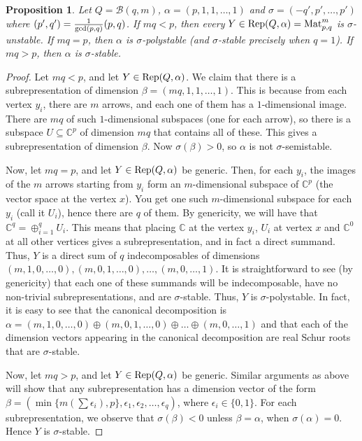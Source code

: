 \documentclass[11pt]{amsart}
\newtheorem{proposition}[theorem]{Proposition}
\theoremstyle{definition}
\newcommand{\Rep}{{\rm Rep}}
\newcommand{\C}{{\mathbb C}}
\newcommand{\Mat}{\operatorname{Mat}}
\begin{document}
\begin{proposition} \label{stab.star}
Let $Q = \mathcal{B}(q,m)$, $\alpha = (p,1,1,\dots,1)$ and $\sigma = (-q',p',\dots,p')$ where $(p',q') = \frac{1}{{\rm gcd}(p,q)} (p,q)$. If $mq < p$, then every $Y \in \Rep(Q,\alpha) = \Mat_{p,q}^m$ is $\sigma$-unstable. If $mq = p$, then $\alpha$ is $\sigma$-polystable (and $\sigma$-stable precisely when $q = 1$). If $mq > p$, then $\alpha$ is $\sigma$-stable.
\end{proposition}


\begin{proof}
Let $mq < p$, and let $Y \in \Rep(Q,\alpha)$. We claim that there is a subrepresentation of dimension $\beta = (mq,1,1,\dots,1)$. This is because from each vertex $y_i$, there are $m$ arrows, and each one of them has a $1$-dimensional image. There are $mq$ of such $1$-dimensional subspaces (one for each arrow), so there is a subspace $U \subseteq \C^p$ of dimension $mq$ that contains all of these. This gives a subrepresentation of dimension $\beta$. Now $\sigma(\beta) > 0$, so $\alpha$ is not $\sigma$-semistable.


Now, let $mq = p$, and let $Y \in \Rep(Q,\alpha)$ be generic. Then, for each $y_i$, the images of the $m$ arrows starting from $y_i$ form an $m$-dimensional subspace of $\C^p$ (the vector space at the vertex $x$). You get one such $m$-dimensional subspace for each $y_i$ (call it $U_i$), hence there are $q$ of them. By genericity, we will have that $\C^q = \oplus_{i=1}^q U_i$. This means that placing $\C$ at the vertex $y_i$, $U_i$ at vertex $x$ and $\C^0$ at all other vertices gives a subrepresentation, and in fact a direct summand. Thus, $Y$ is a direct sum of $q$ indecomposables of dimensions $(m,1,0,\dots,0), (m,0,1,\dots,0),\dots, (m,0,\dots,1)$. It is straightforward to see (by genericity) that each one of these summands will be indecomposable, have no non-trivial subrepresentations, and are $\sigma$-stable. Thus, $Y$ is $\sigma$-polystable. In fact, it is easy to see that the canonical decomposition is $\alpha = (m,1,0,\dots,0) \oplus (m,0,1,\dots,0) \oplus \dots \oplus (m,0,\dots,1)$ and that each of the dimension vectors appearing in the canonical decomposition are real Schur roots that are $\sigma$-stable.


Now, let $mq > p$, and let $Y \in \Rep(Q,\alpha)$ be generic. Similar arguments as above will show that any subrepresentation has a dimension vector of the form $\beta = (\min \{m(\sum \epsilon_i), p\},\epsilon_1,\epsilon_2,\dots,\epsilon_q)$, where $\epsilon_i \in \{0,1\}$. For each subrepresentation, we observe that $\sigma(\beta) < 0$ unless $\beta = \alpha$, when $\sigma(\alpha) = 0$. Hence $Y$ is $\sigma$-stable.
\end{proof}
\end{document}
